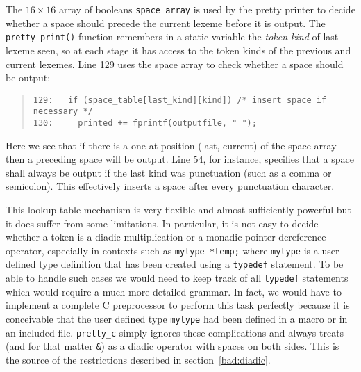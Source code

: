 The $16\times16$ array of booleans \verb+space_array+ is used by the
pretty printer to decide whether a space should precede the current
lexeme before it is output. The \verb+pretty_print()+ function remembers
in a static variable the {\em token kind} of last lexeme seen, so at each
stage it has access to the token kinds of the previous and current lexemes. Line 129 uses
the space array to check whether a space should be output:
\begin{quote}
\footnotesize
\begin{verbatim}
129:   if (space_table[last_kind][kind]) /* insert space if necessary */
130:     printed += fprintf(outputfile, " "); 
\end{verbatim}
\end{quote}
Here we see that if there is a one at position (last, current) of the space array then 
a preceding space will be output. Line 54, for instance, specifies that a space shall always 
be output if the last kind was punctuation (such as a comma or semicolon). This effectively
inserts a space after every punctuation character.

This lookup table mechanism is very flexible and almost sufficiently powerful 
but it does suffer from some limitations. In particular, it is not easy
to decide whether a {\tt *} token is a diadic multiplication or a
monadic pointer dereference operator, especially in contexts such as
\verb+mytype *temp;+ where {\tt mytype} is a user defined type definition
that has been created using a {\tt typedef} statement. To be able to
handle such cases we would need to keep track of all {\tt typedef}
statements which would require a much more detailed grammar. In fact, we
would have to implement a complete C preprocessor to perform this
task perfectly because it is conceivable that the user defined type
\verb+mytype+ had been defined in a macro or in an included file.
\verb+pretty_c+ simply ignores these complications and always treats
{\tt *} (and for that matter {\tt \&}) as a diadic operator with spaces
on both sides. This is the source of the restrictions described in
section~\ref{bad:diadic}.

